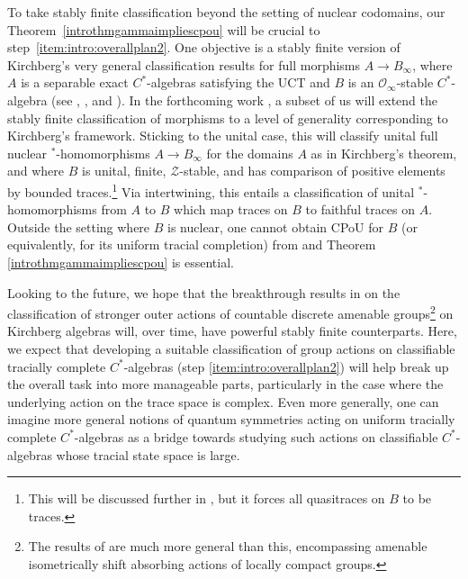 \documentclass[a4paper,11pt]{amsart}
\theoremstyle{definition}
\numberwithin{equation}{section}
\numberwithin{theorem}{section}
\newcommand{\Z}{\mathcal Z}
\begin{document}
To take stably finite classification beyond the setting of nuclear codomains, our Theorem~\ref{introthmgammaimpliescpou} will be crucial to step~\ref{item:intro:overallplan2}.  One objective is a stably finite version of Kirchberg's very general classification results for full morphisms $A\to B_\infty$, where $A$ is a separable exact $C^*$-algebras satisfying the UCT and $B$ is an $\mathcal O_\infty$-stable $C^*$-algebra (see \cite[Theorem 8.3.3]{Rordam-Book}, \cite[Theorems A and B]{Ga21}, and \cite{KirchbergLong}).
 In the forthcoming work \cite{CGSTW2}, a subset of us will extend the stably finite classification of morphisms to a level of generality corresponding to Kirchberg's framework. Sticking to the unital case, this will classify unital full nuclear $^*$-homomorphisms $A\to B_\infty$ for the domains $A$ as in Kirchberg's theorem, and where $B$ is unital, finite, $\Z$-stable, and has comparison of positive elements by bounded traces.\footnote{This will be discussed further in \cite{CGSTW2}, but it forces all quasitraces on $B$ to be traces.} Via intertwining, this entails a classification of unital $^*$-homomorphisms from $A$ to $B$ which map traces on $B$ to faithful traces on $A$.  Outside the setting where $B$ is nuclear, one cannot obtain CPoU for $B$ (or equivalently, for its uniform tracial completion) from \cite{CETWW} and Theorem \ref{introthmgammaimpliescpou} is essential.

Looking to the future, we hope that the breakthrough results in \cite{GS} on the classification of stronger outer actions of countable discrete amenable groups\footnote{The results of \cite{GS} are much more general than this, encompassing amenable isometrically shift absorbing actions of locally compact groups.} on Kirchberg algebras will, over time, have powerful stably finite counterparts.  Here, we expect that developing a suitable classification of group actions on classifiable tracially complete $C^*$-algebras (step \ref{item:intro:overallplan2}) will help break up the overall task into more manageable parts, particularly in the case where the underlying action on the trace space is complex.  Even more generally, one can imagine more general notions of quantum symmetries acting on uniform tracially complete $C^*$-algebras as a bridge towards studying such actions on classifiable $C^*$-algebras whose tracial state space is large.
\end{document}
